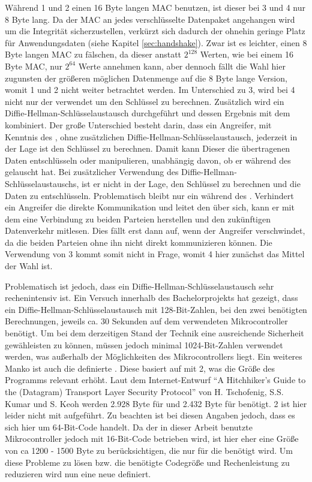 Während 1 und 2 einen 16 Byte langen MAC benutzen, ist dieser bei 3 und 4 nur 8 Byte lang. Da der MAC an jedes verschlüsselte Datenpaket angehangen wird um die
Integrität sicherzustellen, verkürzt sich dadurch der ohnehin geringe Platz für Anwendungsdaten (siehe Kapitel \ref{sec:handshake}). Zwar ist es leichter,
einen 8 Byte langen MAC zu fälschen, da dieser anstatt $ 2^{128} $ Werten, wie bei einem 16 Byte MAC, nur $ 2^{64} $ Werte annehmen kann, aber dennoch fällt die
Wahl hier zugunsten der größeren möglichen Datenmenge auf die 8 Byte lange Version, womit  1 und 2 nicht weiter betrachtet werden.
Im Unterschied zu  3, wird bei  4 nicht nur der  verwendet um den Schlüssel zu berechnen. Zusätzlich wird ein
Diffie-Hellman-Schlüsselaustausch durchgeführt und dessen Ergebnis mit dem  kombiniert. Der große Unterschied besteht darin, dass
ein Angreifer, mit Kenntnis des , ohne zusätzlichen Diffie-Hellman-Schlüsselaustausch, jederzeit in der Lage ist den Schlüssel zu
berechnen. Damit kann Dieser die übertragenen Daten entschlüsseln oder manipulieren, unabhängig davon, ob er während des  gelauscht hat.
Bei zusätzlicher Verwendung des Diffie-Hellman-Schlüsselaustauschs, ist er nicht in der Lage, den Schlüssel zu berechnen und die Daten zu
entschlüsseln. Problematisch bleibt nur ein  während des . Verhindert ein Angreifer die direkte
Kommunikation und leitet den  über sich, kann er mit dem  eine Verbindung zu beiden Parteien herstellen und den
zukünftigen Datenverkehr mitlesen. Dies fällt erst dann auf, wenn der Angreifer verschwindet, da die beiden Parteien ohne ihn nicht
direkt kommunizieren können. Die Verwendung von  3 kommt somit nicht in Frage, womit  4 hier zunächst das Mittel
der Wahl ist.

Problematisch ist jedoch, dass ein Diffie-Hellman-Schlüsselaustausch sehr rechenintensiv ist. Ein Versuch innerhalb des Bachelorprojekts  hat
gezeigt, dass ein Diffie-Hellman-Schlüsselaustausch mit 128-Bit-Zahlen, bei den zwei benötigten Berechnungen, jeweils ca. 30 Sekunden auf dem verwendeten
Mikrocontroller benötigt. Um bei dem derzeitigen Stand der Technik eine ausreichende Sicherheit gewähleisten zu können, müssen jedoch minimal 1024-Bit-Zahlen
verwendet werden, was außerhalb der Möglichkeiten des Mikrocontrollers liegt. Ein weiteres Manko ist auch die definierte .
Diese basiert auf  mit 2, was die Größe des Programms relevant erhöht. Laut dem Internet-Entwurf "`A Hitchhiker's
Guide to the (Datagram) Transport Layer Security Protocol"' \cite{draftmintls} von H. Tschofenig, S.S. Kumar und S. Keoh werden
2.928 Byte für  und 2.432 Byte für  benötigt. 2 ist hier leider nicht mit aufgeführt. Zu beachten ist bei diesen Angaben
jedoch, dass es sich hier um 64-Bit-Code handelt. Da der in dieser Arbeit benutzte Mikrocontroller jedoch mit 16-Bit-Code betrieben wird, ist hier
eher eine Größe von ca 1200 - 1500 Byte zu berücksichtigen, die nur für die  benötigt wird. Um diese Probleme zu lösen bzw. die benötigte
Codegröße und Rechenleistung zu reduzieren wird nun eine neue  definiert.

